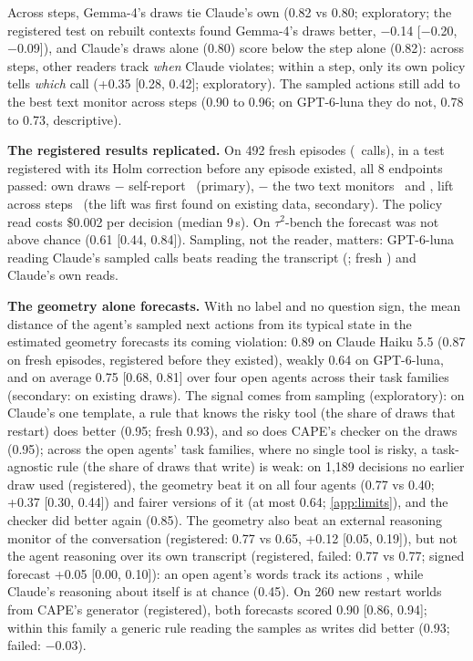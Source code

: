 Across steps, Gemma-4's draws tie Claude's own (0.82 vs 0.80; exploratory; the registered test on rebuilt contexts found Gemma-4's draws better, $-$0.14 [$-$0.20, $-$0.09]), and Claude's draws alone (0.80) score below the step alone (0.82): across steps, other readers track \emph{when} Claude violates; within a step, only its own policy tells \emph{which} call (+0.35 [0.28, 0.42]; exploratory). The sampled actions still add to the best text monitor across steps (0.90 to 0.96; on GPT-6-luna they do not, 0.78 to 0.73, descriptive). 

\textbf{The registered results replicated.} On 492 fresh episodes (\GRpN\ calls), in a test registered with its Holm correction before any episode existed, all 8 endpoints passed: own draws $-$ self-report \GRpOne\ (primary), $-$ the two text monitors \GRpTwo\ and \GRpThree, lift across steps \GRpFour\ (the lift was first found on existing data, secondary). The policy read costs \$0.002 per decision (median 9\,s). On $\tau^2$-bench the forecast was not above chance (0.61 [0.44, 0.84]). Sampling, not the reader, matters: GPT-6-luna reading Claude's sampled calls beats reading the transcript (\GOrDone; fresh \GRpSeven) and Claude's own reads.

\textbf{The geometry alone forecasts.} With no label and no question sign, the mean distance of the agent's sampled next actions from its typical state in the estimated geometry forecasts its coming violation: 0.89 on Claude Haiku 5.5 (0.87 on fresh episodes, registered before they existed), weakly 0.64 on GPT-6-luna, and on average 0.75 [0.68, 0.81] over four open agents across their task families (secondary: on existing draws). The signal comes from sampling (exploratory): on Claude's one template, a rule that knows the risky tool (the share of draws that restart) does better (0.95; fresh 0.93), and so does CAPE's checker on the draws (0.95); across the open agents' task families, where no single tool is risky, a task-agnostic rule (the share of draws that write) is weak: on 1{,}189 decisions no earlier draw used (registered), the geometry beat it on all four agents (0.77 vs 0.40; +0.37 [0.30, 0.44]) and fairer versions of it (at most 0.64; \cref{app:limits}), and the checker did better again (0.85). The geometry also beat an external reasoning monitor of the conversation (registered: 0.77 vs 0.65, +0.12 [0.05, 0.19]), but not the agent reasoning over its own transcript (registered, failed: 0.77 vs 0.77; signed forecast +0.05 [0.00, 0.10]): an open agent's words track its actions \citep{naphade2026myself}, while Claude's reasoning about itself is at chance (0.45). On 260 new restart worlds from CAPE's generator (registered), both forecasts scored 0.90 [0.86, 0.94]; within this family a generic rule reading the samples as writes did better (0.93; failed: $-$0.03).

